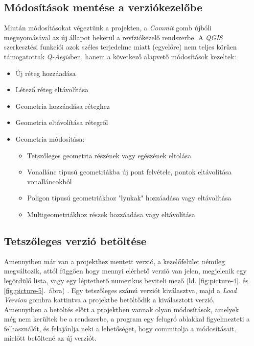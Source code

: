 \subsection{Módosítások mentése a verziókezelőbe}
Miután módosításokat végeztünk a projekten, a \emph{Commit} gomb újbóli megnyomásával az új állapot bekerül a revíziókezelő rendszerbe. A \emph{QGIS} szerkesztési funkciói azok széles terjedelme miatt (egyelőre) nem teljes körűen támogatottak \emph{Q-Aegis}ben, hanem a következő alapvető módosítások kezeltek:
\begin{itemize}
	\item Új réteg hozzáadása
	\item Létező réteg eltávolítása
	\item Geometria hozzáadása réteghez
	\item Geometria eltávolítása rétegről
	\item Geometria módosítása:
	\begin{itemize}
		\item Tetszőleges geometria részének vagy egészének eltolása
		\item Vonallánc típusú geometriákba új pont felvétele, pontok eltávolítása vonalláncokból
		\item Poligon típusú geometriákhoz "lyukak" hozzáadása vagy eltávolítása
		\item Multigeometriákhoz részek hozzáadása vagy eltávolítása
	\end{itemize}	
\end{itemize}

\subsection{Tetszőleges verzió betöltése}
Amennyiben már van a projekthez mentett verzió, a kezelőfelület némileg megváltozik, attól függően hogy mennyi elérhető verzió van jelen, megjelenik egy legördülő lista, vagy egy léptethető numerikus beviteli mező (ld. \ref{fig:picture-4}. és \ref{fig:picture-5}.~ábra) . Egy tetszőleges számú verziót kiválasztva, majd a \textit{Load Version} gombra kattintva a projektbe betöltődik a kiválasztott verzió. Amennyiben a betöltés előtt a projektben vannak olyan módosítások, amelyek még nem kerültek be a rendszerbe, a program egy felugró ablakkal figyelmezteti a felhasználót, és felajánlja neki a lehetőséget, hogy commitolja a módosításait, mielőtt betöltené az új verziót.

